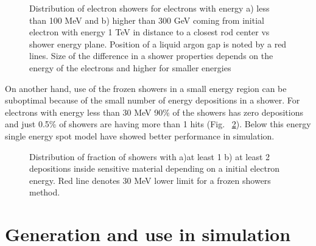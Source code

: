 \begin{figure}[!tbp]
\begin{minipage}[h]{0.49\linewidth}
\end{minipage}
\hfill
\begin{minipage}[h]{0.49\linewidth}
\end{minipage}
\caption{Distribution of electron showers for electrons with energy a) less than 100 MeV  and b) higher than 300 GeV coming from initial electron with energy 1 TeV in distance to a closest rod center vs shower energy plane. Position of a liquid argon gap is noted by a red lines. Size of the difference in a shower properties depends on the energy of the electrons and higher for smaller energies}
\label{fig:FSProduction2}
\end{figure}

On another hand, use of the frozen showers in a small energy region can be suboptimal because of the small number of energy depositions in a shower. For electrons with energy less than 30 MeV 90\% of the showers has zero depositions and just 0.5\% of showers are having more than 1 hits (Fig. ~\ref{fig:fracHits}). Below this energy single energy spot model have showed better performance in simulation.

\begin{figure}[!tbp]
\begin{minipage}[h]{0.49\linewidth}
\end{minipage}
\hfill
\begin{minipage}[h]{0.49\linewidth}
\end{minipage}
\caption{Distribution of fraction of showers with a)at least 1 b) at least 2 depositions inside sensitive material depending on a initial electron energy. Red line denotes 30 MeV lower limit for a frozen showers method.}
\label{fig:fracHits}
\end{figure}


\section{Generation and use in simulation}

